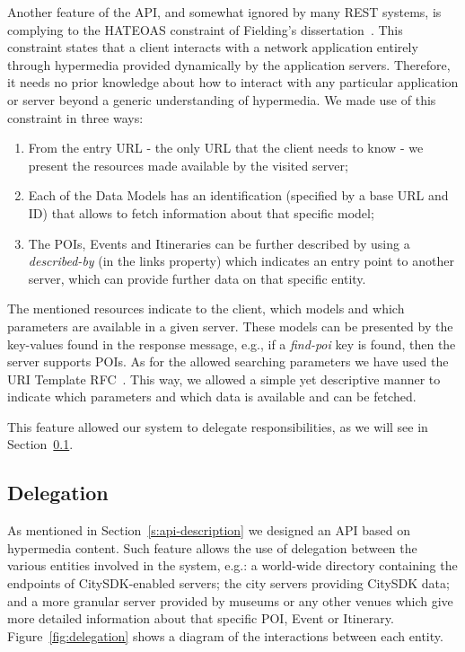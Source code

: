 \documentclass[times,doublespace]{ettauth}%
\begin{document}
Another feature of the API, and somewhat ignored by many REST systems, is complying to the \acf{HATEOAS} constraint of Fielding's dissertation~\cite{fielding_phd}.
This constraint states that a client interacts with a network application entirely through hypermedia provided dynamically by the application servers. Therefore, it needs no prior knowledge about how to interact with any particular application or server beyond a generic understanding of hypermedia. We made use of this constraint in three ways:
\begin{enumerate}
\item From the entry URL - the only URL that the client needs to know - we present the resources made available by the visited server;
\item Each of the Data Models has an identification (specified by a base URL and ID) that allows to fetch information about that specific model;
\item The \acp{POI}, Events and Itineraries can be further described by using a \textit{described-by} (in the links property) which indicates an entry point to another server, which can provide further data on that specific entity.
\end{enumerate}

The mentioned resources indicate to the client, which models and which parameters are available in a given server. These models can be presented by the key-values found in the response message, e.g., if a \textit{find-poi} key is found, then the server supports \acp{POI}. As for the allowed searching parameters we have used the URI Template RFC~\cite{uri-template}. This way, we allowed a simple yet descriptive manner to indicate which parameters and which data is available and can be fetched.

This feature allowed our system to delegate responsibilities, as we will see in Section~\ref{delegation}.

\subsection{Delegation}
\label{delegation}
As mentioned in Section~\ref{s:api-description} we designed an API based on hypermedia content. Such feature allows the use of delegation between the various entities involved in the system, e.g.: a world-wide directory containing the endpoints of CitySDK-enabled servers; the city servers providing CitySDK data; and a more granular server provided by museums or any other venues which give more detailed information about that specific \ac{POI}, Event or Itinerary. Figure~\ref{fig:delegation} shows a diagram of the interactions between each entity.
\end{document}
